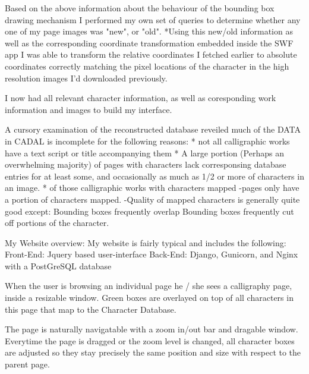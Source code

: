                 Based on the above information about the behaviour of the bounding box drawing mechanism I performed my own set of queries to determine whether any one of my page images was "new", or "old".
                *Using this new/old information as well as the corresponding coordinate transformation embedded inside the SWF app I was able to transform the relative coordinates I fetched earlier to absolute coordinates correctly matching the pixel locations of the character in the high resolution images I'd downloaded previously.
                
                
                I now had all relevant character information, as well as coresponding work information and images to build my interface.
                
    A cursory examination of the reconstructed database reveiled much of the DATA in CADAL is incomplete for the following reasons:
        * not all calligraphic works have a text script or title accompanying them
        * A large portion (Perhaps an overwhelming majority) of pages with characters lack corresponsing database entries for at least some, and occasionally as much as 1/2 or more of characters in an image.
        * of those calligraphic works with characters mapped
            -pages only have a portion of characters mapped.
            -Quality of mapped characters is generally quite good except:
                Bounding boxes frequently overlap
                Bounding boxes frequently cut off portions of the character.                
                
        
        
        My Website overview:
            My website is fairly typical and includes the following:
                Front-End:  Jquery based user-interface
                Back-End:   Django, Gunicorn, and Nginx with a PostGreSQL database
                
            When the user is browsing an individual page he / she sees a calligraphy page, inside a resizable window.
                Green boxes are overlayed on top of all characters in this page that map to the Character Database.
                
                The page is naturally navigatable with a zoom in/out bar and dragable window.
                Everytime the page is dragged or the zoom level is changed, all character boxes are adjusted so they stay precisely the same position and size with respect to the parent page.
                

